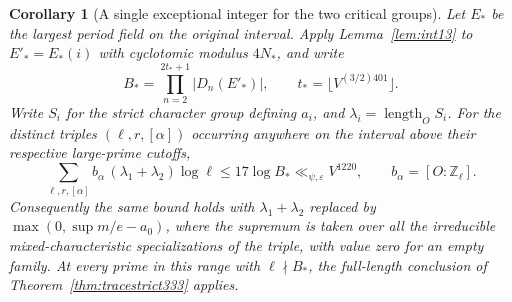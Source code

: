\documentclass[a4paper,11pt]{article}
\newtheorem{corollary}[proposition]{Corollary}
\theoremstyle{definition}
\theoremstyle{remark}
\newcommand{\ZZ}{\mathbb Z}\newcommand{\ord}{\operatorname{ord}}
\newcommand{\len}{\operatorname{length}}\newcommand{\Res}{\operatorname*{Res}}
\numberwithin{equation}{section}
\begin{document}
\begin{corollary}[A single exceptional integer for the two critical groups]
\label{cor:criticaledges333}
Let \(E_*\) be the largest period field on the original interval.
Apply Lemma~\ref{lem:int13} to \(E'_*=E_*(i)\) with cyclotomic
modulus \(4N_*\), and write
\[
   B_*=\prod_{n=2}^{2t_*+1}|D_n(E'_*)|,\qquad
   t_*=\lfloor V^{(3/2)401}\rfloor .
\]
Write \(S_i\) for the strict character group defining \(a_i\), and
\(\lambda_i=\len_O S_i\). For the distinct triples
\((\ell,r,[\alpha])\) occurring anywhere
on the interval above their respective large-prime cutoffs,
\[
  \sum_{\ell,r,[\alpha]} b_\alpha\,(\lambda_1+\lambda_2)\log\ell
       \le 17\log B_*\ll_{\psi,\varepsilon} V^{1220},
       \qquad b_\alpha=[O:\ZZ_\ell].
\]
Consequently the same bound holds with \(\lambda_1+\lambda_2\) replaced by
\(\max(0,\sup m/e-a_0)\), where the supremum is taken over all the
irreducible mixed-characteristic specializations of the triple, with
value zero for an empty family. At every prime in this range with \(\ell\nmid B_*\), the
full-length conclusion of Theorem~\ref{thm:tracestrict333} applies.
\end{corollary}
\end{document}

